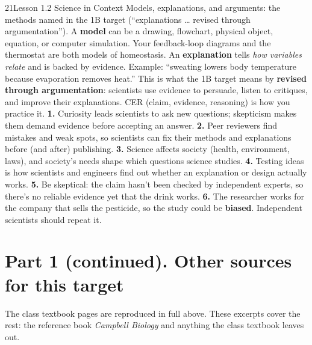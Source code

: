 \documentclass[11pt,letterpaper]{article}
\begin{document}
\begin{tbpage}{21}{Lesson 1.2 Science in Context}
  {Models, explanations, and arguments: the methods named in the 1B target (``explanations \dots{} revised through argumentation'').}
    {A \textbf{model} can be a drawing, flowchart, physical object, equation, or computer simulation. Your feedback-loop diagrams and the thermostat are both models of homeostasis.}
    {An \textbf{explanation} tells \emph{how variables relate} and is backed by evidence. Example: ``sweating lowers body temperature because evaporation removes heat.''}
    {This is what the 1B target means by \textbf{revised through argumentation}: scientists use evidence to persuade, listen to critiques, and improve their explanations. CER (claim, evidence, reasoning) is how you practice it.}
    {\textbf{1.} Curiosity leads scientists to ask new questions; skepticism makes them demand evidence before accepting an answer. \textbf{2.} Peer reviewers find mistakes and weak spots, so scientists can fix their methods and explanations before (and after) publishing.}
    {\textbf{3.} Science affects society (health, environment, laws), and society's needs shape which questions science studies. \textbf{4.} Testing ideas is how scientists and engineers find out whether an explanation or design actually works. \textbf{5.} Be skeptical: the claim hasn't been checked by independent experts, so there's no reliable evidence yet that the drink works. \textbf{6.} The researcher works for the company that sells the pesticide, so the study could be \textbf{biased}. Independent scientists should repeat it.}
\end{tbpage}

\section{Part 1 (continued). Other sources for this target}

The class textbook pages are reproduced in full above. These excerpts cover the rest: the reference book \emph{Campbell Biology} and anything the class textbook leaves out.
\end{document}
